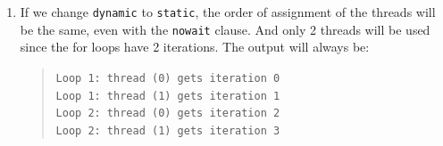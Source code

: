 \begin{enumerate}[label=\textbf{\Alph*)}]
\begin{enumerate}[label=\arabic*.]
        
        \item If we change \texttt{dynamic} to \texttt{static}, the order of assignment of the threads will be the same,
        even with the \texttt{nowait} clause. And only 2 threads will be used since the for loops have 2 iterations. The
        output will always be:
        \begin{quote}
            \texttt{Loop 1: thread (0) gets iteration 0 \\
            Loop 1: thread (1) gets iteration 1 \\
            Loop 2: thread (0) gets iteration 2 \\
            Loop 2: thread (1) gets iteration 3}
        \end{quote}
        

\end{enumerate}
\end{enumerate}
